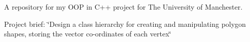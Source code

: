A repository for my O\-O\-P in C++ project for The University of Manchester.

Project brief\-: \char`\"{}\-Design a class hierarchy for creating and manipulating polygon shapes, storing the vector co-\/ordinates of each vertex\char`\"{} 